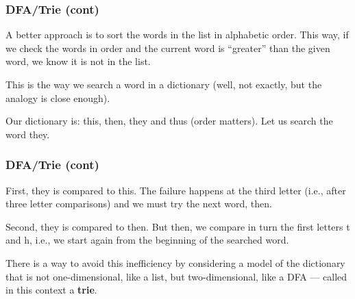 % 
\begin{frame}
\frametitle{DFA/Trie (cont)}

A better approach is to sort the words in the list in alphabetic
order. This way, if we check the words in order and the current word
is ``greater'' than the given word, we know it is not in the list.

\bigskip

This is the way we search a word in a dictionary (well, not exactly,
but the analogy is close enough).

\bigskip

Our dictionary is: \textsf{this}, \textsf{then}, \textsf{they} and
\textsf{thus} (order matters). Let us search the word \textsf{they}.

\end{frame}

% 
\begin{frame}
\frametitle{DFA/Trie (cont)}

First, \textsf{they} is compared to \textsf{this}. The failure happens
at the third letter (i.e., after three letter comparisons) and we must
try the next word, \textsf{then}. 

\bigskip

Second, \textsf{they} is compared to \textsf{then}. But then, we
compare in turn the first letters \textsf{t} and \textsf{h}, i.e., we
start again from the beginning of the searched word.

\bigskip

There is a way to avoid this inefficiency by considering a model of
the dictionary that is not one-dimensional, like a list, but
two-dimensional, like a DFA --- called in this context a
\textbf{trie}.

\end{frame}

